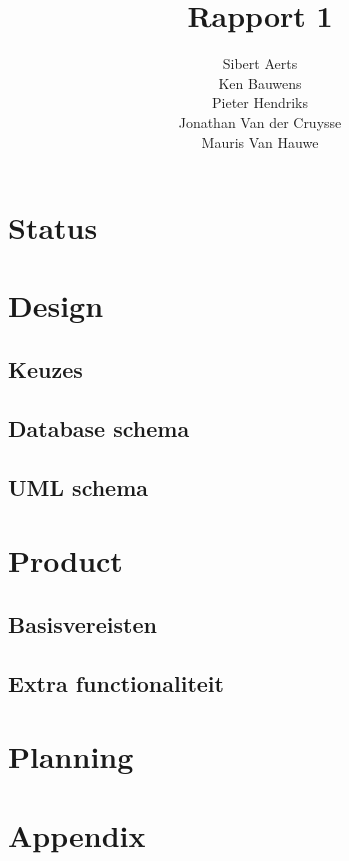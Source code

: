 \documentclass[12pt,a4paper]{article}
\begin{document}
\title{Rapport 1}
\author{Sibert Aerts \\ Ken Bauwens \\ Pieter Hendriks \\ Jonathan Van der Cruysse \\ Mauris Van Hauwe}
\maketitle

\section{Status}

\section{Design}

\subsection{Keuzes}

\subsection{Database schema}

\subsection{UML schema}

\section{Product}

\subsection{Basisvereisten}

\subsection{Extra functionaliteit}

\section{Planning}

\section{Appendix}
\end{document}
